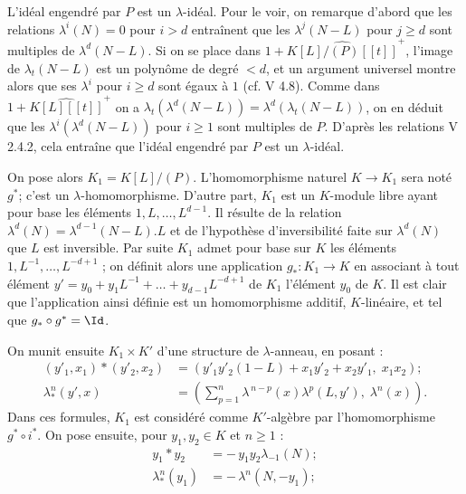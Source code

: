 
L'idéal engendré par \(P\) est un \(\lambda\)-idéal. Pour le voir, on remarque d'abord que les relations \(\lambda^i(N)=0\) pour \(i>d\) entraînent que les \(\lambda^j(N-L)\) pour \(j\ge d\) sont multiples de \(\lambda^d(N-L)\). Si on se place dans \(1+\widehat{K[L]/(P)[[t]]}^+\), l'image de \(\lambda_t(N-L)\) est un polynôme de degré \(<d\), et un argument universel montre alors que ses \(\lambda^i\) pour \(i\ge d\) sont égaux à \(1\) (cf. V 4.8). Comme dans \(1+\widehat{K[L][[t]]}^+\) on a \(\lambda_t(\lambda^d(N-L))=\lambda^d(\lambda_t(N-L))\), on en déduit que les \(\lambda^i(\lambda^d(N-L))\) pour \(i\ge1\) sont multiples de \(P\). D'après les relations V 2.4.2, cela entraîne que l'idéal engendré par \(P\) est un \(\lambda\)-idéal.

On pose alors \(K_1=K[L]/(P)\). L'homomorphisme naturel \(K\to K_1\) sera noté \(g^*\); c'est un \(\lambda\)-homomorphisme. D'autre part, \(K_1\) est un \(K\)-module libre ayant pour base les éléments \(1,L,\ldots,L^{d-1}\). Il résulte de la relation \(\lambda^d(N)=\lambda^{d-1}(N-L).L\) et de l'hypothèse d'inversibilité faite sur \(\lambda^d(N)\) que \(L\) est inversible. Par suite \(K_1\) admet pour base sur \(K\) les éléments \(1,L^{-1},\ldots,L^{-d+1}\) ; on définit alors une application \(g_*:K_1\to K\) en associant à tout élément \(y'=y_0+y_1L^{-1}+\ldots+y_{d-1}L^{-d+1}\) de \(K_1\) l'élément \(y_0\) de \(K\). Il est clair que l'application ainsi définie est un homomorphisme additif, \(K\)-linéaire, et tel que \(g_*\circ g^*=\Id\).

On munit ensuite \(K_1\times K'\) d'une structure de \(\lambda\)-anneau, en posant :
\begin{align}
 (y'_1,x_1)*(y'_2,x_2)
   &=(y'_1y'_2(1-L)+x_1y'_2+x_2y'_1,\; x_1x_2); \tag{4.7.1}\\
 \lambda^n_*(y',x)
   &=\left(\sum_{p=1}^{n}\lambda^{\,n-p}(x)\lambda^p(L,y'),\;
     \lambda^n(x)\right). \tag{4.7.2}
\end{align}
Dans ces formules, \(K_1\) est considéré comme \(K'\)-algèbre par l'homomorphisme \(g^*\circ i^*\).
On pose ensuite, pour \(y_1,y_2\in K\) et \(n\ge1\) :
\begin{align}
 y_1*y_2&=-\,y_1y_2\lambda_{-1}(N); \tag{4.7.3}\\
 \lambda^n_*(y_1)&=-\,\lambda^n(N,-y_1); \tag{4.7.4}
\end{align}
